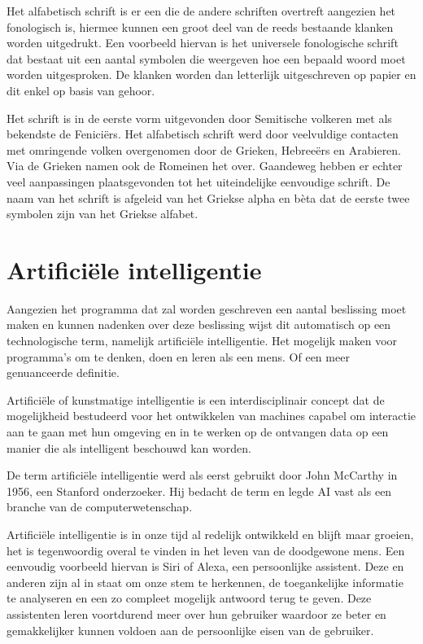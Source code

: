 Het alfabetisch schrift is er een die de andere schriften overtreft aangezien het fonologisch is, hiermee kunnen een groot deel van de reeds bestaande klanken worden uitgedrukt.
Een voorbeeld hiervan is het universele fonologische schrift dat bestaat uit een aantal symbolen die weergeven hoe een bepaald woord moet worden uitgesproken.
De klanken worden dan letterlijk uitgeschreven op papier en dit enkel op basis van gehoor.


\autocite{Rickandie2016} Het schrift is in de eerste vorm uitgevonden door Semitische volkeren met als bekendste de Feniciërs. Het alfabetisch schrift werd door veelvuldige contacten met omringende volken overgenomen door de Grieken, Hebreeërs en Arabieren. Via de Grieken namen ook de Romeinen het over. Gaandeweg hebben er echter veel aanpassingen plaatsgevonden tot het uiteindelijke eenvoudige schrift. De naam van het schrift is afgeleid van het Griekse alpha en bèta dat de eerste twee symbolen zijn van het Griekse alfabet.


\section{Artificiële intelligentie}

Aangezien het programma dat zal worden geschreven een aantal beslissing moet maken en kunnen nadenken over deze beslissing wijst dit automatisch op een technologische term, namelijk artificiële intelligentie.
Het mogelijk maken voor programma's om te denken, doen en leren als een mens.
Of een meer genuanceerde definitie.

Artificiële of kunstmatige intelligentie is een interdisciplinair concept dat de mogelijkheid bestudeerd voor het ontwikkelen van machines capabel om interactie aan te gaan met hun omgeving en in te werken op de ontvangen data op een manier die als intelligent beschouwd kan worden.

De term artificiële intelligentie werd als eerst gebruikt door John McCarthy in 1956, een Stanford onderzoeker.
Hij bedacht de term en legde AI vast als een branche van de computerwetenschap.

Artificiële intelligentie is in onze tijd al redelijk ontwikkeld en blijft maar groeien, het is tegenwoordig overal te vinden in het leven van de doodgewone mens.
Een eenvoudig voorbeeld hiervan is Siri of Alexa, een persoonlijke assistent. Deze en anderen zijn al in staat om onze stem te herkennen, de toegankelijke informatie te analyseren en een zo compleet mogelijk antwoord terug te geven. Deze assistenten leren voortdurend meer over hun gebruiker waardoor ze beter en gemakkelijker kunnen voldoen aan de persoonlijke eisen van de gebruiker.

